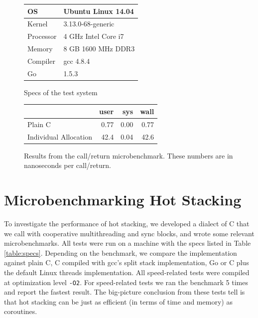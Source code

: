 \documentclass[a4paper,UKenglish,cleveref, autoref]{lipics-v2019}
\begin{document}
\begin{figure}
    \centering
    \begin{minipage}[t]{0.47\textwidth}
  \begin{tabular}{|l|l|}
    \hline
    OS & Ubuntu Linux 14.04 \\
    \hline
    Kernel & 3.13.0-68-generic \\
    \hline
    Processor & 4 GHz Intel Core i7 \\
    \hline
    Memory & 8 GB 1600 MHz DDR3 \\
    \hline
    Compiler & gcc 4.8.4 \\
    \hline
    Go & 1.5.3 \\
    \hline
  \end{tabular}
        \caption{Specs of the test system}
        \label{table:specs}
    \end{minipage}\hfill
    \begin{minipage}[t]{0.47\textwidth}

      \begin{tabular}{|l|r|r|r|}
  \hline
   & user & sys & wall \\
  \hline
  \hline
  Plain C & 0.77 & 0.00 & 0.77 \\
  \hline
  Individual Allocation & 42.4 & 0.04 & 42.6 \\
  \hline
\end{tabular}

      \caption{Results from the call{\slash}return microbenchmark.
      These numbers are in nanoseconds per call{\slash}return.}
        \label{fig:call_return_results}
    \end{minipage}
\end{figure}

\section{Microbenchmarking Hot Stacking}

To investigate the performance of hot stacking, we developed a dialect of C that we call \charcoal{} with cooperative multithreading and sync blocks, and wrote some relevant microbenchmarks.
All tests were run on a machine with the specs listed in Table \ref{table:specs}.
Depending on the benchmark, we compare the \charcoal{} implementation against plain C, C compiled with gcc's split stack implementation, Go or C plus the default Linux threads implementation.
All speed-related tests were compiled at optimization level \texttt{-O2}.
For speed-related tests we ran the benchmark 5 times and report the fastest result.
The big-picture conclusion from these tests tell is that hot stacking can be just as efficient (in terms of time and memory) as coroutines.
\end{document}
